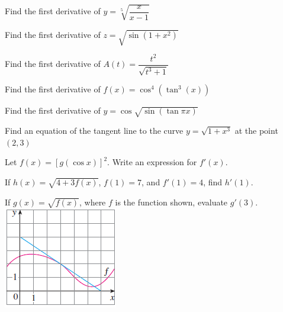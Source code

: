 \documentclass[notes]{subfiles}
\begin{document}
		\begin{ex}
			Find the first derivative of \(y = \sqrt[5]{\dfrac{x}{x-1}}\)
		\end{ex}
			
		\begin{ex}
			Find the first derivative of \(z = \sqrt{\sin(1+x^2)}\)
		\end{ex}
			\newpage
			
		\begin{ex}
			Find the first derivative of \(A(t) = \dfrac{t^2}{\sqrt{t^3+1}}\)
		\end{ex}
			
		\begin{ex}
			Find the first derivative of \(f(x) = \cos^4(\tan^3(x))\)
		\end{ex}
			
		\begin{ex}
			Find the first derivative of \(y = \cos\sqrt{\sin(\tan\pi x)}\)
		\end{ex}
			\newpage
			
		\begin{ex}
			Find an equation of the tangent line to the curve \(y = \sqrt{1+x^3}\) at the point \((2,3)\)
		\end{ex}
			
		\begin{ex}
			Let \(f(x) = [g(\cos x)]^2\).  Write an expression for \(f'(x)\).
		\end{ex}
			
		\begin{ex}
			If \(h(x) = \sqrt{4+3f(x)}\), \(f(1) = 7\), and \(f'(1) = 4\), find \(h'(1)\).
		\end{ex}
			
		\begin{ex}
			If \(g(x) = \sqrt{f(x)}\), where \(f\) is the function shown, evaluate \(g'(3)\).\\
			\includegraphics{3.6fig1}
		\end{ex}
			\newpage
		
\end{document}
